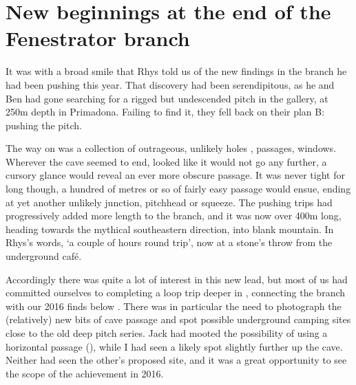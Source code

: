 \section{New beginnings at the end of the Fenestrator branch}

\begin{marginfigure}
\end{marginfigure}

It was with a broad smile that Rhys told us of the new findings in the  branch he had been pushing this year. That discovery had been serendipitous, as he and Ben had gone searching for a rigged but undescended pitch in the  gallery, at 250m depth in \passage[cave]Primadona. Failing to find it, they fell back on their plan B: pushing the  pitch.

The way on was a collection of  outrageous, unlikely holes , passages, windows. Wherever the cave seemed to end, looked like it would not go any further, a cursory glance would reveal an ever more obscure passage. It was never tight for long though, a hundred of metres or so of fairly easy passage would ensue, ending at yet another unlikely junction, pitchhead or squeeze. The pushing trips had progressively added more length to the branch, and it was now over 400m long, heading towards the mythical southeastern direction, into blank mountain. In Rhys’s words, ‘a couple of hours round trip’, now at a stone’s throw from the underground café. 


Accordingly there was quite a lot of interest in this new lead, but most of us had committed ourselves to completing a loop trip  deeper in , connecting the  branch with our 2016 finds below . There was in particular the need to photograph the (relatively) new bits of cave passage and spot possible underground camping sites close to the old deep pitch series. Jack had mooted the possibility of using a horizontal passage (), while I had seen a likely spot slightly further up the cave. Neither had seen the other’s proposed site, and it was a great opportunity to see the scope of the achievement in 2016. 

